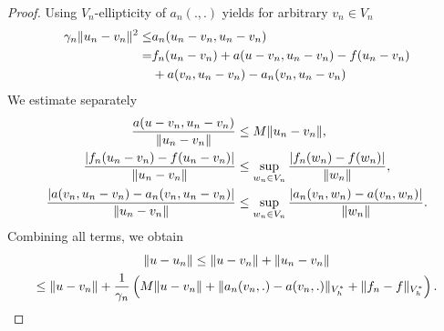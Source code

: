 \begin{proof}
  Using $V_n$-ellipticity of $a_n(.,.)$ yields for arbitrary $v_n\in V_n$
  \begin{align*}
    \gamma_n \lVert u_n-v_n\rVert^2
    \le &a_n(u_n-v_n,u_n-v_n)\\
    =& f_n(u_n-v_n) + a(u-v_n, u_n-v_n)
       - f(u_n-v_n)
    \\ &+ a(v_n,u_n-v_n) - a_n(v_n, u_n-v_n)
  \end{align*}
  We estimate separately
  \begin{align*}
    \frac{a(u-v_n, u_n-v_n)}{\lVert u_n-v_n\rVert}
    &\le M \lVert u_n-v_n\rVert,\\
    \frac{\lvert f_n(u_n-v_n) - f(u_n-v_n)\rvert}{\lVert u_n-v_n\rVert}
    &\le \sup_{w_n\in V_n} \frac{\lvert f_n(w_n)-f(w_n)\rvert}{\lVert w_n\rVert},
    \\
    \frac{\lvert a(v_n,u_n-v_n) - a_n(v_n, u_n-v_n)\rvert}{\lVert u_n-v_n\rVert}
    &\le \sup_{w_n\in V_n} \frac{\lvert a_n(v_n, w_n)-a(v_n,w_n)\rvert}{\lVert w_n\rVert}.
  \end{align*}
  Combining all terms, we obtain
  \begin{multline}
    \lVert u-u_n\rVert
    \le \lVert u-v_n\rVert + \lVert u_n-v_n\rVert \\
    \le \lVert u-v_n\rVert + \frac1{\gamma_n}\left(
         M \lVert u-v_n\rVert
         + \lVert a_n(v_n,.)-a(v_n,.)\rVert_{V_h^*}
         + \lVert f_n-f\rVert_{V_h^*}\right).
  \end{multline}
\end{proof}

